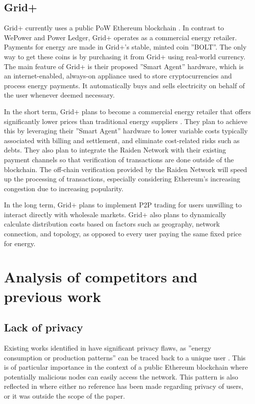 \subsection{Grid+}

Grid+ currently uses a public PoW Ethereum blockchain \cite{Gril18}. In contrast to WePower and Power Ledger, Grid+ operates as a commercial energy retailer. Payments for energy are made in Grid+’s stable, minted coin ”BOLT”. The only way to get these coins is by purchasing it from Grid+ using real-world currency. The main feature of Grid+ is their proposed ”Smart Agent” hardware, which is an internet-enabled, always-on appliance used to store cryptocurrencies and process energy payments. It automatically buys and sells electricity on behalf of the user whenever deemed necessary.

In the short term, Grid+ plans to become a commercial energy retailer that offers significantly lower prices than traditional energy suppliers \cite{Gril18}. They plan to achieve this by leveraging their ”Smart Agent” hardware to lower variable costs typically associated with billing and settlement, and eliminate cost-related risks such as debts. They also plan to integrate the Raiden Network with their existing payment channels so that verification of transactions are done outside of the blockchain. The off-chain verification provided by the Raiden Network will speed up the processing of transactions, especially considering Ethereum’s increasing congestion due to increasing popularity.

In the long term, Grid+ plans to implement P2P trading for users unwilling to interact directly with wholesale markets. Grid+ also plans to dynamically calculate distribution costs based on factors such as geography, network connection, and topology, as opposed to every user paying the same fixed price for energy.


\section{Analysis of competitors and previous work}

\subsection{Lack of privacy}

Existing works identified in \cite{spb} have significant privacy flaws, as ”energy consumption or production patterns” can be traced back to a unique user \cite[p.1]{spb}. This is of particular importance in the context of a public Ethereum blockchain where potentially malicious nodes can easily access the network. This pattern is also reflected in \cite{HSLC17, Huk18, Vuk16, WeP17, Led18, Gril18} where either no reference has been made regarding privacy of users, or it was outside the scope of the paper.

